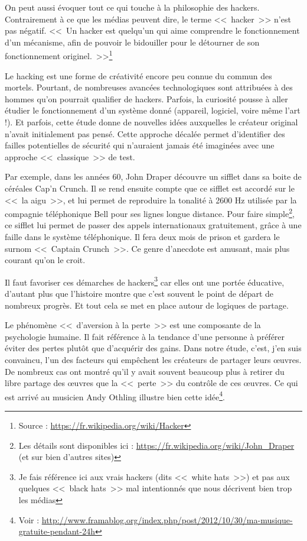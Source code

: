 On peut aussi évoquer tout ce qui touche à la philosophie des hackers.
Contrairement à ce que les médias peuvent dire, le terme <<~hacker~>> n'est pas négatif.
<<~Un hacker est quelqu'un qui aime comprendre le fonctionnement d'un mécanisme, afin de pouvoir le bidouiller pour le détourner de son fonctionnement originel.~>>\footnote{Source : \url{https://fr.wikipedia.org/wiki/Hacker}}

Le hacking est une forme de créativité encore peu connue du commun des mortels.
Pourtant, de nombreuses avancées technologiques sont attribuées à des hommes qu'on pourrait qualifier de hackers.
Parfois, la curiosité pousse à aller étudier le fonctionnement d'un système donné (appareil, logiciel, voire même l'art !).
Et parfois, cette étude donne de nouvelles idées auxquelles le créateur original n'avait initialement pas pensé.
Cette approche décalée permet d'identifier des failles potentielles de sécurité qui n'auraient jamais été imaginées avec une approche <<~classique~>> de test.

Par exemple, dans les années 60, John Draper découvre un sifflet dans sa boite de céréales Cap'n Crunch.
Il se rend ensuite compte que ce sifflet est accordé sur le <<~la aigu~>>, et lui permet de reproduire la tonalité à 2600 Hz utilisée par la compagnie téléphonique Bell pour ses lignes longue distance.
Pour faire simple\footnote{Les détails sont disponibles ici : \url{https://fr.wikipedia.org/wiki/John_Draper} (et sur bien d'autres sites)}, ce sifflet lui permet de passer des appels internationaux gratuitement, grâce à une faille dans le système téléphonique.
Il fera deux mois de prison et gardera le surnom <<~Captain Crunch~>>.
Ce genre d'anecdote est amusant, mais plus courant qu'on le croit.

Il faut favoriser ces démarches de hackers\footnote{Je fais référence ici aux vrais hackers (dits <<~white hats~>>) et pas aux quelques <<~black hats~>> mal intentionnés que nous décrivent bien trop les médias} car elles ont une portée éducative, d'autant plus que l'histoire montre que c'est souvent le point de départ de nombreux progrès.
Et tout cela se met en place autour de logiques de partage.

Le phénomène <<~d'aversion à la perte~>> est une composante de la psychologie humaine.
Il fait référence à la tendance d'une personne à préférer éviter des pertes plutôt que d'acquérir des gains.
Dans notre étude, c'est, j'en suis convaincu, l'un des facteurs qui empêchent les créateurs de partager leurs œuvres.
De nombreux cas ont montré qu'il y avait souvent beaucoup plus à retirer du libre partage des œuvres que la <<~perte~>> du contrôle de ces œuvres.
Ce qui est arrivé au musicien Andy Othling illustre bien cette idée\footnote{Voir : \url{http://www.framablog.org/index.php/post/2012/10/30/ma-musique-gratuite-pendant-24h}}.

